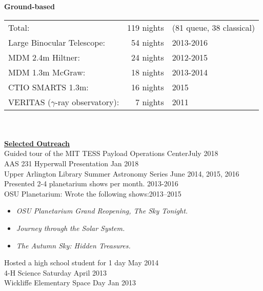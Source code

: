 \documentclass[letterpaper,11pt]{article}
\begin{document}
\textbf{Ground-based}\\
\begin{tabular}[t]{lrl}
Total:&                                        119 nights& (81 queue, 38 classical)\\
Large Binocular Telescope:&       54 nights& 2013-2016\\
MDM 2.4m Hiltner:&                   24 nights& 2012-2015\\
MDM 1.3m McGraw: &               18 nights& 2013-2014\\
CTIO SMARTS 1.3m: &              16 nights& 2015\\
VERITAS ($\gamma$-ray observatory): &   7 nights& 2011   \\ 
\end{tabular}
\\
\\


\noindent\underline{\textbf{Selected Outreach}}\\
Guided tour of the MIT TESS Payload Operations Center\hfill July 2018\\
AAS 231 Hyperwall Presentation \hfill Jan 2018\\
Upper Arlington Library Summer Astronomy Series \hfill June 2014, 2015, 2016\\
Presented 2-4 planetarium shows per month. \hfill 2013-2016\\
OSU Planetarium: Wrote the following shows:\hfill2013--2015
\begin{itemize}[nosep,label=\textbullet]
\item \textit{OSU Planetarium Grand Reopening, The Sky Tonight.}
\item \textit{Journey through the Solar System.}
\item \textit{The Autumn Sky:  Hidden Treasures.}
\end{itemize}
\noindent Hosted a high school student for 1 day \hfill May 2014\\
4-H Science Saturday \hfill April 2013\\
Wickliffe Elementary Space Day \hfill  Jan 2013\\


\end{document}
